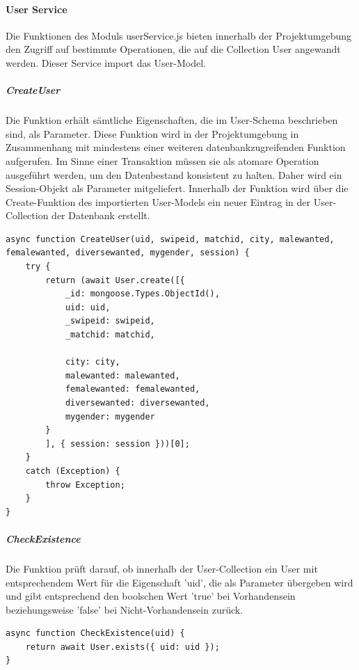 %
%

\paragraph{User Service}
Die Funktionen des Moduls userService.js bieten innerhalb der Projektumgebung den Zugriff auf bestimmte Operationen, die auf die Collection User angewandt werden. Dieser Service import das User-Model.

\noindent
\subparagraph{CreateUser}
Die Funktion erhält sämtliche Eigenschaften, die im User-Schema beschrieben sind, als Parameter. Diese Funktion wird in der Projektumgebung in Zusammenhang mit mindestens einer weiteren datenbankzugreifenden Funktion aufgerufen. Im Sinne einer Transaktion müssen sie als atomare Operation ausgeführt werden, um den Datenbestand konsistent zu halten. Daher wird ein Session-Objekt als Parameter mitgeliefert. Innerhalb der Funktion wird über die Create-Funktion des importierten User-Models ein neuer Eintrag in der User-Collection der Datenbank erstellt.

\begin{lstlisting}[caption=User Service - CreateUser, label=lst:userservicecreateuser]
async function CreateUser(uid, swipeid, matchid, city, malewanted, femalewanted, diversewanted, mygender, session) {
    try {
        return (await User.create([{
            _id: mongoose.Types.ObjectId(),
            uid: uid,
            _swipeid: swipeid,
            _matchid: matchid,

            city: city,
            malewanted: malewanted,
            femalewanted: femalewanted,
            diversewanted: diversewanted,
            mygender: mygender
        }
        ], { session: session }))[0];
    }
    catch (Exception) {
        throw Exception;
    }
}
\end{lstlisting}

\noindent
\subparagraph{CheckExistence}
Die Funktion prüft darauf, ob innerhalb der User-Collection ein User mit entsprechendem Wert für die Eigenschaft 'uid', die als Parameter übergeben wird und gibt entsprechend den boolschen Wert 'true' bei Vorhandensein beziehungsweise 'false' bei Nicht-Vorhandensein zurück.

\begin{lstlisting}[caption=User Service - CheckExistence, label=lst:userservicecheckexistence]
async function CheckExistence(uid) {
    return await User.exists({ uid: uid });
}
\end{lstlisting}

